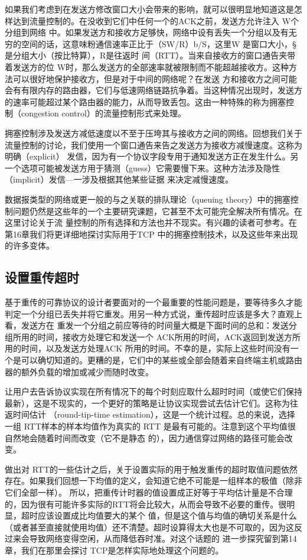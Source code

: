 如果我们考虑到在发送方修改窗口大小会带来的影响，就可以很明显地知道这是怎样达到流量控制的。在没收到它们中任何一个的ACK之前，发送方允许注入 W个分组到网络
中。如果发送方和接收方足够快，网络中设有丢失一个分组以及有无穷的空间的话，这意味粉通信速率正比于（SW/R）b/S，这里W 是窗口大小，§是分组大小（按比特算），R是往返时
间（RTT）。当来自接收方的窗口通告夹带着发送方的位 W时，那么发送方的全部速率就被限制而不能超越接收方。这种方法可以很好地保护接收方，但是对于中间的网络呢？在发送
方和接收方之间可能会有有限内存的路由器，它们与低速网络链路抗争着。当这种情况出现时，发送方的速率可能超过某个路由器的能力，从而导致丢包。这由一种特殊的称为拥塞控
制（congestion control）的流量控制形式来处理。

拥塞控制涉及发送方减低速度以不至于压垮其与接收方之间的网络。回想我们关于流量控制的讨论，我们使用一个窗口通告来告之发送方为接收方减慢速度。这称为明确（explicit）
发信，因为有一个协议字段专用于通知发送方正在发生什么。另一个选项可能被发送方用于猜测（guess）它需要慢下来。这种方法涉及隐性（implicit）发信—一涉及根据其他某些证据
来决定减慢速度。

数据报类型的网络或更一般的与之关联的排队理论（queuing theory）中的拥塞控制问题仍然是这些年的一个主要研究课题，它甚至不太可能完全解决所有情况。在这里讨论关于流
量控制的所有选择和方法也并不现实。有兴趣的读者可参考。在第16章我们将更详细地探讨实际用于TCP 中的拥塞控制技术，以及这些年来出现的许多变体。
\subsection{设置重传超时}
基于重传的可靠协议的设计者要面对的一个最重要的性能问题是，要等待多久才能判定一个分组已丢失并将它重发。用另一种方式说，重传超时应该是多大？直观上看，发送方在
重发一个分组之前应等待的时间量大概是下面时间的总和：发送分组所用的时间，接收方处理它和发送一个 ACK所用的时间，ACK返回到发送方所用的时间，以及发送方处理ACK
所用的时间。不幸的是，实际上这些时间没有一个是可以确切知道的。更糟的是，它们中的某些或全部会随着来自终端主机或路由器的额外负载的增加或减少而随时改变。

让用户去告诉协议实现在所有情况下的每个时刻应取什么超时时间（或使它们保持最新），这是不现实的，一个更好的策略是让协议实现尝试去估计它们。这称为往返时间估计
（round-tip-time estimation），这是一个统计过程。总的来说，选择一组 RTT样本的样本均值作为真实的 RTT 是最有可能的。注意到这个平均值很自然地会随着时间而改变（它不是静态
的），因力通信穿过网络的路径可能会改变。

做出对 RTT的一些估计之后，关于设置实际的用于触发重传的超时取值问题依然存在。如果我们回想一下均值的定义，会知道它绝不可能是一组样本的极值（除非它们全部一样）。
所以，把重传计时器的值设置成正好等于平均估计量是不合理的，因为很有可能许多实际的RTT将会比较大，从而会导致不必要的重传。很明显，超时应该设置成比均值要大的某个
值，但是这个值与均值的确切关系是什么（或者甚至直接就使用均值）还不清楚。超时设算得太大也是不可取的，因为这反过来会导致网络变得空闲，从而降低吞时准。对这个话题的
进一步探究留到第14 章，我们在那里会探讨 TCP是怎样实际地处理这个问题的。

